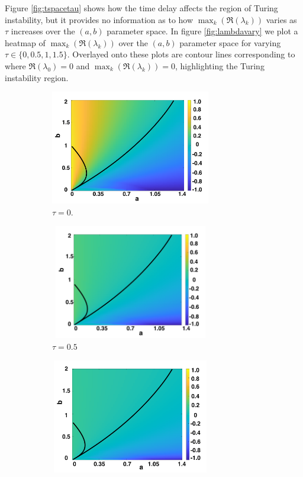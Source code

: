 Figure \ref{fig:tspacetau} shows how the time delay affects the region of Turing instability, but it provides no information as to how $\max_k(\Re(\lambda_k))$ varies as $\tau$ increases over the $(a,b)$ parameter space. In figure \ref{fig:lambdavary} we plot a heatmap of $\max_k(\Re(\lambda_k))$ over the $(a,b)$ parameter space for varying $\tau\in\{0,0.5,1,1.5\}$. Overlayed onto these plots are contour lines corresponding to where $\Re(\lambda_0)=0$ and $\max_k(\Re(\lambda_k))=0$,
highlighting the Turing instability region.
\begin{figure}[H]
    \centering
    \begin{subfigure}[t]{0.45\textwidth}
        \centering
        \includegraphics[width=7cm,height=5cm]{tau0bif.png}
        \caption{$\tau=0$.}
        \label{}
    \end{subfigure}
    \hfill
    \begin{subfigure}[t]{0.45\textwidth}
        \centering
        \includegraphics[width=7cm,height=5cm]{tau05bif.png}
        \caption{$\tau=0.5$}
        \label{}
    \end{subfigure}
    \hfill
    \begin{subfigure}[t]{0.45\textwidth}
        \centering
        \includegraphics[width=7cm,height=5cm]{tau1bif.png}

\end{subfigure}
\end{figure}
